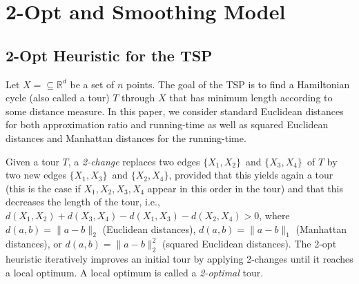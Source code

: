 \documentclass[11pt,DIV=12,a4paper]{scrartcl}
\newcommand{\edge}[2]{\ensuremath{\{X_{#1}, X_{#2}\}}}
\newcommand{\real}{\ensuremath{\mathbb{R}}}
\begin{document}
%
%
%


\section{2-Opt and Smoothing Model}

\subsection{2-Opt Heuristic for the TSP}

Let $X = \subseteq \real^d$ be a set of $n$ points.
The goal of the TSP is to find a Hamiltonian cycle (also called a tour)
$T$ through $X$ that has minimum length according to some distance measure.
In this paper, we consider standard Euclidean distances for both approximation ratio and running-time
as well as
squared Euclidean distances and Manhattan distances for the running-time.

Given a tour $T$, a \emph{2-change}
replaces two edges \edge 12\ and \edge 34\ of $T$ by two new
edges \edge 13\ and \edge 24,
provided that this yields again a tour
(this is the case if $X_1, X_2, X_3, X_4$ appear in this order in the tour)
and that this decreases the length of the tour, i.e.,
$d(X_1, X_2) + d(X_3, X_4) - d(X_1, X_3) - d(X_2, X_4) > 0$,
where $d(a,b) = \|a-b\|_2$ (Euclidean distances),
$d(a,b) = \|a-b\|_1$ (Manhattan distances), or
$d(a,b) = \|a-b\|_2^2$ (squared Euclidean distances). The 2-opt heuristic
iteratively improves an initial tour by applying 2-changes until it reaches a local optimum.
A local optimum is called a \emph{2-optimal} tour.
\end{document}
